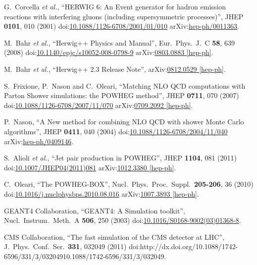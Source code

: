 \begin{thebibliography}{99}
G.~Corcella {\it et al.}, ``HERWIG 6: An Event generator for hadron emission reactions with interfering gluons (including supersymmetric processes)'', JHEP {\bf 0101}, 010 (2001) doi:\href{http://dx.doi.org/10.1088/1126-6708/2001/01/010}{10.1088/1126-6708/2001/01/010} arXiv:\href{https://arxiv.org/abs/hep-ph/0011363}{hep-ph/0011363}. 
 
M.~Bahr {\it et al.}, ``Herwig++ Physics and Manual'', Eur.\ Phys.\ J.\ C {\bf 58}, 639 (2008) doi:\href{http://dx.doi.org/10.1140/epjc/s10052-008-0798-9}{10.1140/epjc/s10052-008-0798-9} arXiv:\href{https://arxiv.org/abs/0803.0883}{0803.0883 [hep-ph]}.

M.~Bahr {\it et al.}, ``Herwig++ 2.3 Release Note'', arXiv:\href{https://arxiv.org/abs/0812.0529}{0812.0529 [hep-ph]}.

S.~Frixione, P.~Nason and C.~Oleari, ``Matching NLO QCD computations with Parton Shower simulations: the POWHEG method'', JHEP {\bf 0711}, 070 (2007) doi:\href{http://dx.doi.org/10.1088/1126-6708/2007/11/070}{10.1088/1126-6708/2007/11/070} arXiv:\href{https://arxiv.org/abs/0709.2092}{0709.2092 [hep-ph]}.

P.~Nason, ``A New method for combining NLO QCD with shower Monte Carlo algorithms'', JHEP {\bf 0411}, 040 (2004) doi:\href{http://dx.doi.org/10.1088/1126-6708/2004/11/040}{10.1088/1126-6708/2004/11/040} arXiv:\href{https://arxiv.org/abs/hep-ph/0409146}{hep-ph/0409146}.

S.~Alioli {\it et al.}, ``Jet pair production in POWHEG'', JHEP {\bf 1104}, 081 (2011) doi:\href{http://dx.doi.org/10.1007/JHEP04(2011)081}{10.1007/JHEP04(2011)081} arXiv:\href{https://arxiv.org/abs/1012.3380}{1012.3380 [hep-ph]}.

C.~Oleari, ``The POWHEG-BOX'', Nucl.\ Phys.\ Proc.\ Suppl.\ {\bf 205-206}, 36 (2010) doi:\href{http://dx.doi.org/10.1016/j.nuclphysbps.2010.08.016}{10.1016/j.nuclphysbps.2010.08.016} arXiv:\href{https://arxiv.org/abs/1007.3893}{1007.3893 [hep-ph]}.

GEANT4 Collaboration, ``GEANT4: A Simulation toolkit'', Nucl.\ Instrum.\ Meth.\ A {\bf 506}, 250 (2003) doi:\href{http://dx.doi.org/10.1016/S0168-9002(03)01368-8}{10.1016/S0168-9002(03)01368-8}.

CMS Collaboration, ``The fast simulation of the CMS detector at LHC'', J.\ Phys.\ Conf.\ Ser.\ {\bf 331}, 032049 (2011) doi:{http://dx.doi.org/10.1088/1742-6596/331/3/032049}{10.1088/1742-6596/331/3/032049}.


\end{thebibliography}

